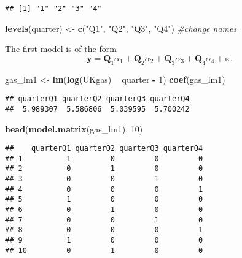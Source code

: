 \documentclass[]{book}
\newenvironment{Shaded}{\begin{snugshade}}{\end{snugshade}}
\newcommand{\CommentTok}[1]{\textcolor[rgb]{0.56,0.35,0.01}{\textit{#1}}}
\newcommand{\DecValTok}[1]{\textcolor[rgb]{0.00,0.00,0.81}{#1}}
\newcommand{\KeywordTok}[1]{\textcolor[rgb]{0.13,0.29,0.53}{\textbf{#1}}}
\newcommand{\NormalTok}[1]{#1}
\newcommand{\OperatorTok}[1]{\textcolor[rgb]{0.81,0.36,0.00}{\textbf{#1}}}
\newcommand{\StringTok}[1]{\textcolor[rgb]{0.31,0.60,0.02}{#1}}
\theoremstyle{definition}
\theoremstyle{definition}
\theoremstyle{definition}
\theoremstyle{remark}
\begin{document}
\begin{verbatim}
## [1] "1" "2" "3" "4"
\end{verbatim}

\begin{Shaded}
\begin{Highlighting}[]
\KeywordTok{levels}\NormalTok{(quarter) <-}\StringTok{ }\KeywordTok{c}\NormalTok{(}\StringTok{"Q1"}\NormalTok{, }\StringTok{"Q2"}\NormalTok{, }\StringTok{"Q3"}\NormalTok{, }\StringTok{"Q4"}\NormalTok{) }\CommentTok{#change names}
\end{Highlighting}
\end{Shaded}

The first model is of the form
\[ \boldsymbol{y} = \mathbf{Q}_1 \alpha_1 + \mathbf{Q}_2 \alpha_2 + \mathbf{Q}_3 \alpha_3 + \mathbf{Q}_4 \alpha_4 + \boldsymbol{\varepsilon}.
\]

\begin{Shaded}
\begin{Highlighting}[]
\NormalTok{gas_lm1 <-}\StringTok{ }\KeywordTok{lm}\NormalTok{(}\KeywordTok{log}\NormalTok{(UKgas) }\OperatorTok{~}\StringTok{ }\NormalTok{quarter }\OperatorTok{-}\StringTok{ }\DecValTok{1}\NormalTok{)}
\KeywordTok{coef}\NormalTok{(gas_lm1)}
\end{Highlighting}
\end{Shaded}

\begin{verbatim}
## quarterQ1 quarterQ2 quarterQ3 quarterQ4 
##  5.989307  5.586806  5.039595  5.700242
\end{verbatim}

\begin{Shaded}
\begin{Highlighting}[]
\KeywordTok{head}\NormalTok{(}\KeywordTok{model.matrix}\NormalTok{(gas_lm1), }\DecValTok{10}\NormalTok{)}
\end{Highlighting}
\end{Shaded}

\begin{verbatim}
##    quarterQ1 quarterQ2 quarterQ3 quarterQ4
## 1          1         0         0         0
## 2          0         1         0         0
## 3          0         0         1         0
## 4          0         0         0         1
## 5          1         0         0         0
## 6          0         1         0         0
## 7          0         0         1         0
## 8          0         0         0         1
## 9          1         0         0         0
## 10         0         1         0         0
\end{verbatim}
\end{document}
